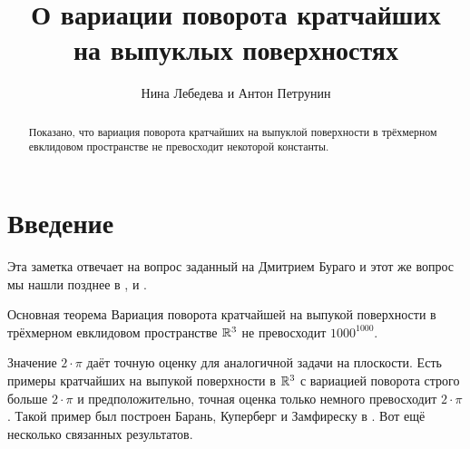 \documentclass[a4paper,10pt]{article}
\begin{document}
\title{О вариации поворота кратчайших\\
 на выпуклых поверхностях}
\author{Нина Лебедева и Антон Петрунин}



\date{}
\maketitle

\begin{abstract}
Показано, что вариация поворота кратчайших
на выпуклой поверхности в трёхмерном евклидовом пространстве 
не превосходит некоторой константы.
\end{abstract}


\section{Введение}


Эта заметка отвечает на вопрос заданный на Дмитрием Бураго и
этот же вопрос мы нашли позднее в \cite{AH-PSV}, \cite{pach} и \cite{BKZ}. 

\begin{thm}{Основная теорема}\label{thm:main}
Вариация поворота кратчайшей
на выпукой поверхности в трёхмерном евклидовом пространстве $\mathbb{R}^3$ 
не превосходит $1000^{1000}$.
\end{thm}

Значение $2\cdot\pi$ даёт точную оценку для аналогичной задачи на плоскости.
Есть примеры кратчайших на выпукой поверхности в $\mathbb{R}^3$
с вариацией поворота строго больше $2\cdot\pi$ и
предположительно, точная оценка только немного превосходит $2\cdot\pi$.
Такой пример был построен Барань, Куперберг и Замфиреску в \cite{BKZ}. 
Вот ещё несколько связанных результатов.
\end{document}
